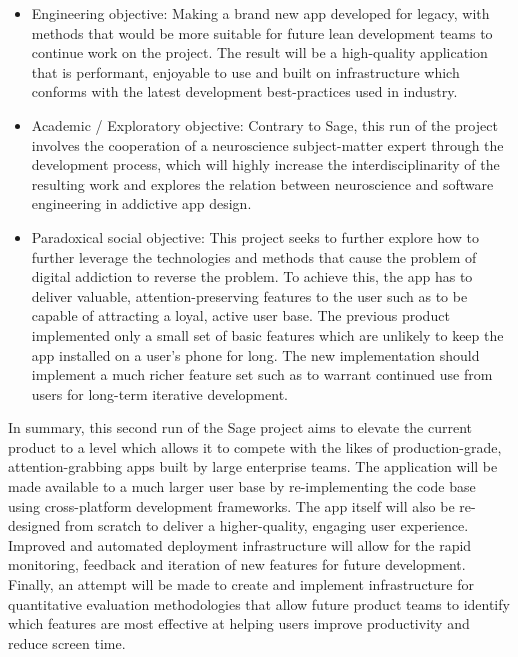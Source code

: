 \begin{itemize}
    \item Engineering objective: Making a brand new app developed for legacy, with methods that would be more suitable for future lean development teams to continue work on the project. The result will be a high-quality application that is performant, enjoyable to use and built on infrastructure which conforms with the latest development best-practices used in industry.
    \item Academic / Exploratory objective: Contrary to Sage, this run of the project involves the cooperation of a neuroscience subject-matter expert through the development process, which will highly increase the interdisciplinarity of the resulting work and explores the relation between neuroscience and software engineering in addictive app design.
    \item Paradoxical social objective: This project seeks to further explore how to further leverage the technologies and methods that cause the problem of digital addiction to reverse the problem. To achieve this, the app has to deliver valuable, attention-preserving features to the user such as to be capable of attracting a loyal, active user base. The previous product implemented only a small set of basic features which are unlikely to keep the app installed on a user's phone for long. The new implementation should implement a much richer feature set such as to warrant continued use from users for long-term iterative development.
\end{itemize}

In summary, this second run of the Sage project aims to elevate the current product to a level which allows it to compete with the likes of production-grade, attention-grabbing apps built by large enterprise teams. The application will be made available to a much larger user base by re-implementing the code base using cross-platform development frameworks. The app itself will also be re-designed from scratch to deliver a higher-quality, engaging user experience. Improved and automated deployment infrastructure will allow for the rapid monitoring, feedback and iteration of new features for future development. Finally, an attempt will be made to create and implement infrastructure for quantitative evaluation methodologies that allow future product teams to identify which features are most effective at helping users improve productivity and reduce screen time.
